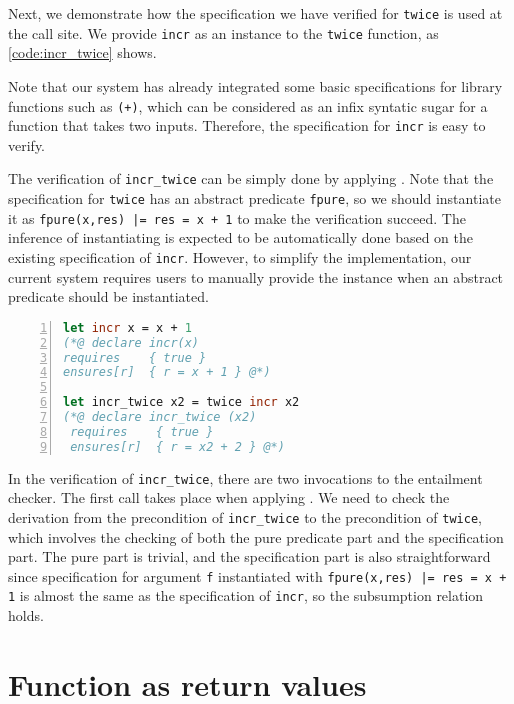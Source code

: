 Next, we demonstrate how the specification we have verified for \texttt{twice} is used at the call site. We provide \texttt{incr} as an instance to the \texttt{twice} function, as \autoref{code:incr_twice} shows. 

Note that our system has already integrated some basic specifications for library functions such as \texttt{(+)}, which can be considered as an infix syntatic sugar for a function that takes two inputs. Therefore, the specification for \texttt{incr} is easy to verify.

The verification of \texttt{incr\_twice} can be simply done by applying . Note that the specification for \texttt{twice} has an abstract predicate \texttt{fpure}, so we should instantiate it as \texttt{fpure(x,res) |= res = x + 1} to make the verification succeed. The inference of instantiating is expected to be automatically done based on the existing specification of \texttt{incr}. However, to simplify the implementation, our current system requires users to manually provide the instance when an abstract predicate should be instantiated.

\begin{lstlisting}[language=Caml, mathescape=true, xleftmargin=2em, aboveskip=1em, xrightmargin=1em, numbers=left, frame = {TB}, caption=Higher order twice function application, label=code:incr_twice]
let incr x = x + 1
(*@ declare incr(x)
requires    { true }
ensures[r]  { r = x + 1 } @*)

let incr_twice x2 = twice incr x2
(*@ declare incr_twice (x2)
 requires    { true }
 ensures[r]  { r = x2 + 2 } @*)
\end{lstlisting}

In the verification of \texttt{incr\_twice}, there are two invocations to the entailment checker. The first call takes place when applying . We need to check the derivation from the precondition of \texttt{incr\_twice} to the precondition of \texttt{twice}, which involves the checking of both the pure predicate part and the specification part. The pure part is trivial, and the specification part is also straightforward since specification for argument \texttt{f} instantiated with \texttt{fpure(x,res) |= res = x + 1} is almost the same as the specification of \texttt{incr}, so the subsumption relation holds.


\section{Function as return values}

